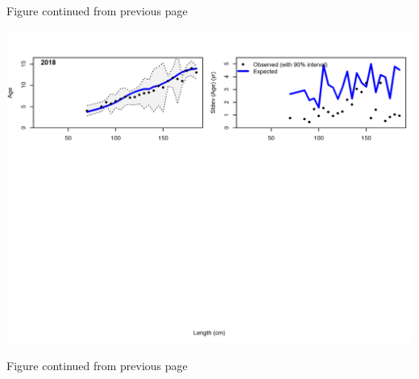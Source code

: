 \documentclass[12pt,]{article}
\begin{document}
\begin{center} 

              Figure continued from previous page 

             \end{center}

\includegraphics{./r4ss/plots_mod1/comp_condAALfit_Andre_plotsflt1mkt2_page3.png}

\begin{center} 

              Figure continued from previous page 

             \end{center}
\end{document}
